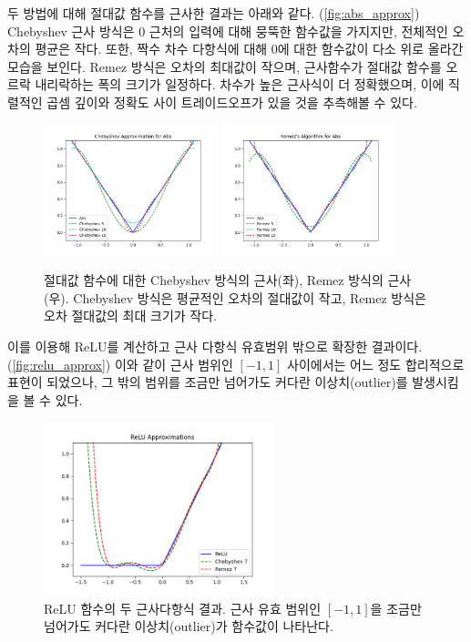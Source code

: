 \documentclass[a4paper, 11pt, chapterprefix=false]{report}
\begin{document}
두 방법에 대해 절대값 함수를 근사한 결과는 아래와 같다.
(\autoref{fig:abs_approx}) Chebyshev 근사 방식은 0 근처의 입력에 대해 뭉뚝한
함수값을 가지지만, 전체적인 오차의 평균은 작다. 또한, 짝수 차수 다항식에 대해
0에 대한 함수값이 다소 위로 올라간 모습을 보인다. Remez 방식은 오차의 최대값이
작으며, 근사함수가 절대값 함수를 오르락 내리락하는 폭의 크기가 일정하다. 차수가
높은 근사식이 더 정확했으며, 이에 직렬적인 곱셈 깊이와 정확도 사이
트레이드오프가 있을 것을 추측해볼 수 있다.
\begin{figure}[htbp]
  \centering
  \includegraphics[width=0.45\textwidth]{resource/chebyshev.png}
  \includegraphics[width=0.45\textwidth]{resource/remez.png}
  \caption{절대값 함수에 대한 Chebyshev 방식의 근사(좌), Remez 방식의 근사(우). Chebyshev 방식은 평균적인 오차의 절대값이 작고, Remez 방식은 오차 절대값의 최대 크기가 작다.}
  \label{fig:abs_approx}
\end{figure}

이를 이용해 ReLU를 계산하고 근사 다항식 유효범위 밖으로 확장한 결과이다.
(\autoref{fig:relu_approx}) 이와 같이 근사 범위인 $[-1, 1]$ 사이에서는 어느 정도
합리적으로 표현이 되었으나, 그 밖의 범위를 조금만 넘어가도 커다란
이상치(outlier)를 발생시킴을 볼 수 있다.
\begin{figure}[htbp]
  \centering
  \includegraphics[width=0.6\textwidth]{resource/relu.png}
  \caption{ReLU 함수의 두 근사다항식 결과. 근사 유효 범위인 $[-1, 1]$을 조금만 넘어가도 커다란 이상치(outlier)가 함수값이 나타난다.}
  \label{fig:relu_approx}
\end{figure}
\end{document}
